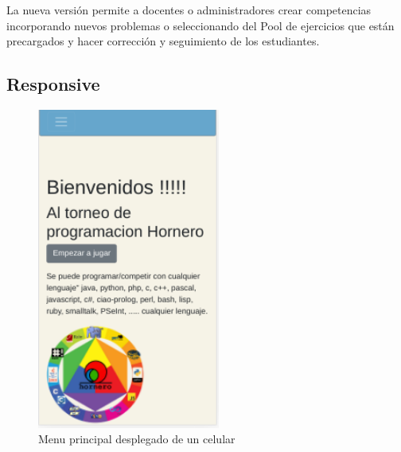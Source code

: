 \documentclass{articleteyet}
\begin{document}


 La nueva versión permite a docentes o administradores crear competencias incorporando nuevos problemas o seleccionando del Pool de ejercicios que están precargados y hacer corrección y seguimiento de los estudiantes.
 


\subsection{Responsive}

\begin{figure}
\begin{center}
\includegraphics[width=6cm]{img/responsive.png}
\caption{Menu principal desplegado de un celular}
\label{1fig}
\end{center}
\end{figure}
\end{document}
